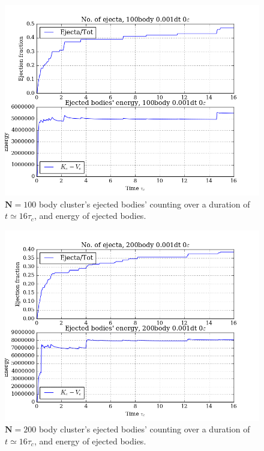 \documentclass[11pt,a4paper,notitlepage,twocolumn]{article}
\begin{document}
\begin{figure}
[H]\center
\includegraphics[scale=0.35]{../figs/ClusterEnergiesEjecEn_100body_dt1_eps0_dur16.png}
\caption{$\mathbf{N} = 100$ body cluster's ejected bodies' counting over a duration of $t \simeq 16\tau_c$, and energy of ejected bodies.}
\end{figure}
\begin{figure}
[H]\center
\includegraphics[scale=0.35]{../figs/ClusterEnergiesEjecEn_200body_dt1_eps0_dur16.png}
\caption{$\mathbf{N} = 200$ body cluster's ejected bodies' counting over a duration of $t \simeq 16\tau_c$, and energy of ejected bodies.}
\end{figure}
\end{document}
